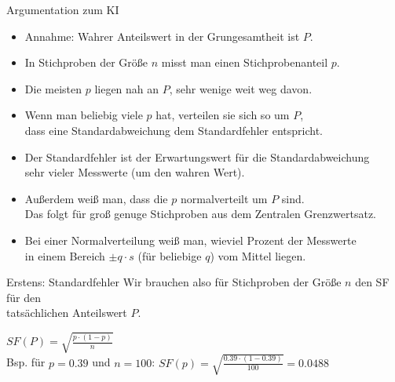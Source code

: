 \begin{frame}
  {Argumentation zum KI}
  \begin{itemize}[<+->]
    \item Annahme: Wahrer \alert{Anteilswert in der Grungesamtheit} ist $P$.
    \item In \alert{Stichproben der Größe $n$} misst man einen \alert{Stichprobenanteil $p$}.
    \item Die meisten $p$ liegen nah an $P$, sehr wenige weit weg davon.
    \item Wenn man beliebig viele $p$ hat, verteilen sie sich so um $P$,\\
      dass eine Standardabweichung dem \alert{Standardfehler} entspricht.
    \item Der Standardfehler ist der Erwartungswert für die Standardabweichung\\
      sehr vieler Messwerte (um den wahren Wert).
    \item Außerdem weiß man, dass die \alert{$p$ normalverteilt um $P$} sind.\\
      Das folgt für groß genuge Stichproben aus dem \alert{Zentralen Grenzwertsatz}.
    \item Bei einer Normalverteilung weiß man, \alert{wieviel Prozent der Messwerte}\\
      \alert{in einem Bereich $\pm q\cdot s$} (für beliebige $q$) vom Mittel liegen.
  \end{itemize}
\end{frame}

\begin{frame}
  {Erstens: Standardfehler}
  Wir brauchen also für Stichproben der Größe $n$ den SF für den\\
  tatsächlichen Anteilswert $P$.\\[3ex]

  \begin{center}
    $SF(P)=\sqrt{\frac{p\cdot(1-p)}{n}}$\\

    \vspace{1cm}
    Bsp. für $p=0.39$ und $n=100$: $SF(p)=\sqrt{\frac{0.39\cdot(1-0.39)}{100}}=0.0488$
  \end{center}
\end{frame}


